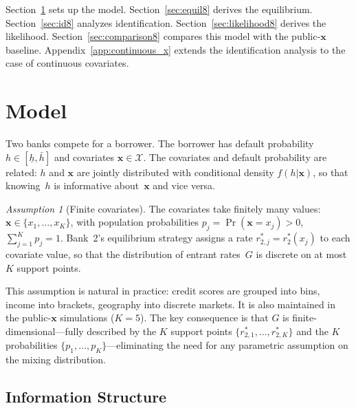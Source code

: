 \documentclass[12pt]{article}
\theoremstyle{plain}
\theoremstyle{plain}
\theoremstyle{definition}
\theoremstyle{remark}
\newtheorem{ass}[thm]{Assumption}
\begin{document}
Section~\ref{sec:model8} sets up the model.  Section~\ref{sec:equil8} derives the equilibrium.  Section~\ref{sec:id8} analyzes identification.  Section~\ref{sec:likelihood8} derives the likelihood.  Section~\ref{sec:comparison8} compares this model with the public-$\mathbf{x}$ baseline.  Appendix~\ref{app:continuous_x} extends the identification analysis to the case of continuous covariates.



\section{Model}\label{sec:model8}

Two banks compete for a borrower.  The borrower has default probability $h \in [\underline{h}, \bar{h}]$ and covariates $\mathbf{x} \in \mathcal{X}$.  The covariates and default probability are related: $h$ and $\mathbf{x}$ are jointly distributed with conditional density $f(h|\mathbf{x})$, so that knowing~$h$ is informative about~$\mathbf{x}$ and vice versa.

\begin{ass}[Finite covariates]\label{ass:finite_x}
The covariates take finitely many values: $\mathbf{x} \in \{x_1, \ldots, x_K\}$, with population probabilities $p_j = \Pr(\mathbf{x} = x_j) > 0$, $\sum_{j=1}^K p_j = 1$.  Bank~2's equilibrium strategy assigns a rate $r_{2,j}^* = r_2^*(x_j)$ to each covariate value, so that the distribution of entrant rates~$G$ is discrete on at most~$K$ support points.
\end{ass}

This assumption is natural in practice: credit scores are grouped into bins, income into brackets, geography into discrete markets.  It is also maintained in the public-$\mathbf{x}$ simulations ($K = 5$).  The key consequence is that $G$ is finite-dimensional---fully described by the $K$ support points $\{r_{2,1}^*, \ldots, r_{2,K}^*\}$ and the $K$ probabilities $\{p_1, \ldots, p_K\}$---eliminating the need for any parametric assumption on the mixing distribution.

\subsection{Information Structure}
\end{document}
